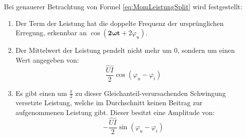 Bei genauerer Betrachtung von Formel \eqref{eq:MomLeistungSplit} wird festgestellt:
\begin{enumerate}
\item Der Term der Leistung hat die doppelte Frequenz der ursprünglichen Erregung, erkennbar an $\cos(\mathbf{2\omega t} + 2\varphi_u)$. 
\item Der Mittelwert der Leistung pendelt nicht mehr um 0, sondern um einen Wert angegeben von:
\begin{equation}
\frac{\hat{U}\hat{I}}{2}\cos(\varphi_u-\varphi_i) \label{eq:LeistungGleichanteil}
\end{equation}
\item Es gibt einen um $\frac{\pi}{2}$ zu dieser Gleichanteil-verursachenden Schwingung versetzte Leistung, welche im Durchschnitt keinen Beitrag zur aufgenommenen Leistung gibt. Dieser besitzt eine Amplitude von:
\begin{equation}
-\frac{\hat{U}\hat{I}}{2}\sin(\varphi_u - \varphi_i) \label{eq:LeistungBlindanteil}
\end{equation}
\end{enumerate}